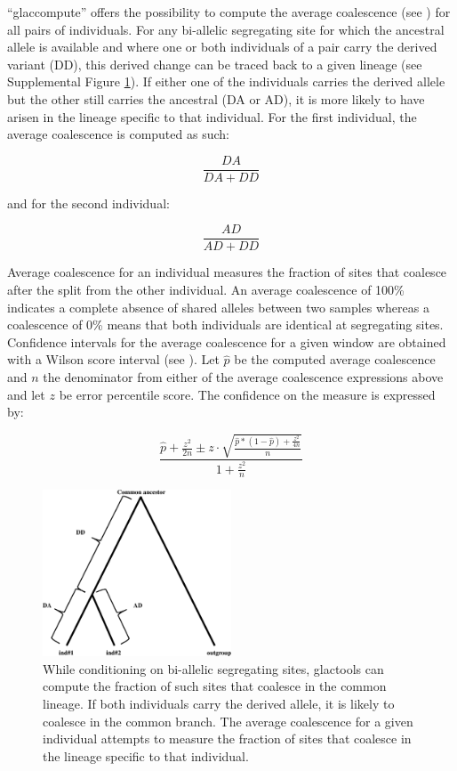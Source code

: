 \documentclass[a4paper]{article}
\begin{document}
``glaccompute'' offers the possibility to compute the average coalescence (see \cite{prufer2010computational}) for all pairs of individuals. For any bi-allelic segregating site for which the ancestral allele is available and where one or both individuals of a pair carry the derived variant (DD), this derived change can be traced back to a given lineage (see Supplemental Figure \ref{fig:div}). If either one of the individuals carries the derived allele but the other still carries the ancestral (DA or AD), it is more likely to have arisen in the lineage specific to that individual. For the first individual, the average coalescence is computed as such: 

\[
\frac { DA} { DA+DD }
\]

\noindent and for the second individual:

\[
\frac {AD} { AD+DD }
\]

Average coalescence for an individual measures the fraction of sites that coalesce after the split from the other individual. An average coalescence of 100\% indicates a complete absence of shared alleles between two samples whereas a coalescence of 0\% means that both individuals are identical at segregating sites. Confidence intervals for the average coalescence for a given window are obtained  with a Wilson score interval (see \cite{wilson1927probable}). Let $\hat{p}$ be the computed average coalescence and $n$ the denominator from either of the average coalescence expressions above and let $z$ be error percentile score. The confidence on the measure is expressed by:


\[
\frac{  \hat{p} + \frac {z^2} {2n} \pm z \cdot \sqrt {  \frac {\hat{p}*(1-\hat{p})+ \frac {z^2} {4n} } {n} }} {1+ \frac {z^2} {n} }
\]

\begin{figure}[!tpb]%
  \centerline{\includegraphics[width=0.5\textwidth,natwidth=510,natheight=542]{coasnowhite.eps}}
\caption{
While conditioning on bi-allelic segregating sites, glactools can compute the fraction of such sites that coalesce in the common lineage. If both individuals carry the derived allele, it is likely to coalesce in the common branch. The average coalescence for a given individual attempts to measure the fraction of sites that coalesce in the lineage specific to that individual.}
\label{fig:div}
\end{figure}
\end{document}
